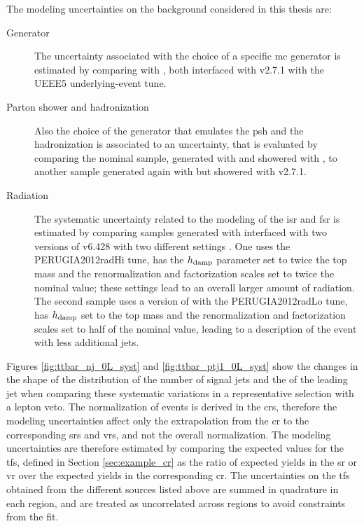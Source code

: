 The modeling uncertainties on the \ttbar background considered in this thesis are:
\begin{description}
\item[Generator] The uncertainty associated with the choice of a specific \gls{mc} generator is estimated by comparing \PowhegBox with \aNLO, both interfaced with \HWpp v2.7.1 with the UEEE5 underlying-event tune.

\item[Parton shower and hadronization] Also the choice of the generator that emulates the \gls{psh} and the hadronization is associated to an uncertainty, that is evaluated by comparing the nominal sample, generated with \PowhegBox and showered with \PY, to another sample generated again with \PowhegBox but showered with \HWpp v2.7.1. 

\item[Radiation] The systematic uncertainty related to the modeling of the \gls{isr} and \gls{fsr} is estimated by comparing samples
generated with \PowhegBox interfaced with two versions of \PY v6.428 with two different settings \cite{Skands:2010ak}. 
One uses the PERUGIA2012radHi tune, has the $h_{\rm{damp}}$ parameter set to twice the top mass and the renormalization and factorization scales set to twice the nominal value; these settings lead to an overall larger amount of radiation. The second sample uses a version of \PY with the PERUGIA2012radLo tune, has $h_{\rm{damp}}$ set to the top mass and the renormalization and factorization scales set to half of the nominal value, leading to a description of the event with less additional jets.

\end{description}

Figures \ref{fig:ttbar_nj_0L_syst} and \ref{fig:ttbar_ptj1_0L_syst} show the changes in the shape of the distribution of the number of signal jets and the \pt of the leading jet when comparing these systematic variations in a representative selection with a lepton veto.
The normalization of \ttbar events is derived in the \glspl{cr}, therefore the modeling uncertainties affect only the extrapolation from 
the \gls{cr} to the corresponding \glspl{sr} and \glspl{vr}, and not the overall normalization. 
The modeling uncertainties are therefore estimated by comparing the expected values for the \glspl{tf}, defined in Section \ref{sec:example_cr} 
as the ratio of expected yields in the \gls{sr} or \gls{vr} over the expected yields in the corresponding \gls{cr}. 
The uncertainties on the \glspl{tf} obtained from the different sources listed above are summed in quadrature in each region, and are treated as uncorrelated across regions to avoid 
constraints from the fit. 


